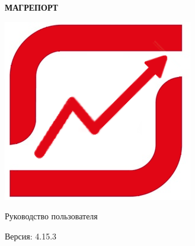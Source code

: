 \documentclass[../user-manual.tex]{subfiles}
\begin{document}
	\begin{titlepage}
		
		\begin{center}
			
			\vspace*{5cm}
			
			\Huge
			
			\textbf{МАГРЕПОРТ}
			
			\vspace{2cm}

			\includegraphics[width=\graphicswidth]{img/magreport-logo.png}
			
			\vspace{2cm}
			
			\LARGE
			
			Руководство пользователя
			
			\vfill
			
			\large
			
			Версия: 4.15.3
		
		\end{center}
	\end{titlepage}
	
\end{document}
